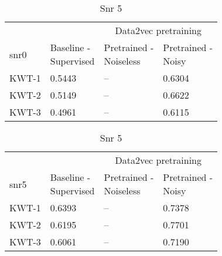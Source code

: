 \begin{table}[ht]
    \begin{subtable}[ht]{0.45\textwidth}
        \centering
        \begin{tabular}{@{}llll@{}}
        \toprule
        & & \multicolumn{2}{c}{Data2vec pretraining} \\ \cline{3-4}
        snr0    & \makecell{ Baseline - \\ Supervised } & \makecell{ Pretrained - \\ Noiseless } & \makecell{ Pretrained - \\ Noisy } \\ \midrule
        KWT-1    & 0.5443  & -- & 0.6304 \\
        KWT-2    & 0.5149  & -- & 0.6622 \\
        KWT-3    & 0.4961  & -- & 0.6115 \\
        \bottomrule
        \end{tabular}
        \caption{Snr 0}
    \end{subtable}
    \hfill
    \begin{subtable}[ht]{0.45\textwidth}
        \centering
        \begin{tabular}{@{}llll@{}}
        \toprule
        & & \multicolumn{2}{c}{Data2vec pretraining} \\ \cline{3-4}
        snr5    & \makecell{ Baseline - \\ Supervised } & \makecell{ Pretrained - \\ Noiseless } & \makecell{ Pretrained - \\ Noisy } \\ \midrule
        KWT-1    & 0.6393  & -- & 0.7378 \\
        KWT-2    & 0.6195  & -- & 0.7701 \\
        KWT-3    & 0.6061  & -- & 0.7190 \\
        \bottomrule
        \end{tabular}
        \caption{Snr 5}
    \end{subtable}


    \bigskip



\end{table}
